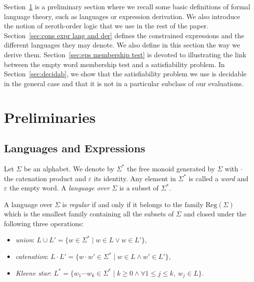 \documentclass[a4paper]{llncs}
\begin{document}
  Section~\ref{se:pre} is a preliminary section where  we recall some basic definitions of formal language theory, such as languages or expression derivation. We also introduce the notion of zeroth-order logic that we use in the rest of the paper.
  Section~\ref{sec:cons expr lang and der} defines the constrained expressions and the different languages they may denote. We also define in this section the way we derive them.
  Section~\ref{sec:eps membership test} is devoted to illustrating the link between the empty word membership test and a satisfiability problem.
  In Section~\ref{sec:decidab}, we show that the satisfiability problem we use is decidable in the general case and that it is not in a particular subclass of our evaluations.
  
    

\section{Preliminaries}\label{se:pre}

  \subsection{Languages and Expressions}
  
  Let $\Sigma$ be an alphabet. We denote by $\Sigma^*$ the free monoid generated by $\Sigma$ with $\cdot$ the catenation product and $\varepsilon$ its identity. Any element in $\Sigma^*$ is called a \emph{word} and $\varepsilon$ the empty word. A \emph{language over} $\Sigma$ is a subset of $\Sigma^*$. 
  
  A language over $\Sigma$ is \emph{regular} if and only if it belongs to the family $\mathrm{Reg}(\Sigma)$ which is the smallest family containing all the subsets of $\Sigma$ and closed under the following three operations:
  \begin{itemize}
    \item \emph{union}: $L\cup L'=\{w\in\Sigma^*\mid w\in L\vee w\in L'\}$,
    \item \emph{catenation}: $L\cdot L'=\{w\cdot w'\in\Sigma^*\mid w\in L\wedge w'\in L'\}$,
    \item \emph{Kleene star}: $L^*=\{w_1\cdots w_k\in\Sigma^*\mid k\geq 0 \wedge \forall 1\leq j\leq k,\ w_j\in L\}$.
  \end{itemize}
  
\end{document}
